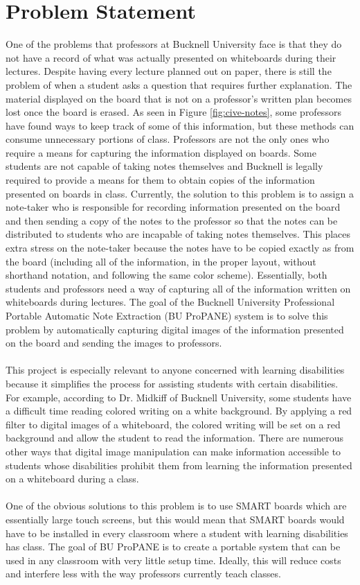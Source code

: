 \documentclass{article}
\begin{document}
	\section{Problem Statement}
		One of the problems that professors at Bucknell University face is that they do not have a record of what was actually presented on whiteboards during their lectures. Despite having every lecture planned out on paper, there is still the problem of when a student asks a question that requires further explanation. The material displayed on the board that is not on a professor's written plan becomes lost once the board is erased. As seen in Figure \ref{fig:cive-notes}, some professors have found ways to keep track of some of this information, but these methods can consume unnecessary portions of class. Professors are not the only ones who require a means for capturing the information displayed on boards. Some students are not capable of taking notes themselves and Bucknell is legally required to provide a means for them to obtain copies of the information presented on boards in class. Currently, the solution to this problem is to assign a note-taker who is responsible for recording information presented on the board and then sending a copy of the notes to the professor so that the notes can be distributed to students who are incapable of taking notes themselves. This places extra stress on the note-taker because the notes have to be copied exactly as from the board (including all of the information, in the proper layout, without shorthand notation, and following the same color scheme). Essentially, both students and professors need a way of capturing all of the information written on whiteboards during lectures. The goal of the Bucknell University Professional Portable Automatic Note Extraction (BU ProPANE) system is to solve this problem by automatically capturing digital images of the information presented on the board and sending the images to professors.\\
		\\
		This project is especially relevant to anyone concerned with learning disabilities because it simplifies the process for assisting students with certain disabilities. For example, according to Dr. Midkiff of Bucknell University, some students have a difficult time reading colored writing on a white background. By applying a red filter to digital images of a whiteboard, the colored writing will be set on a red background and allow the student to read the information. There are numerous other ways that digital image manipulation can make information accessible to students whose disabilities prohibit them from learning the information presented on a whiteboard during a class.\\
		\\
		One of the obvious solutions to this problem is to use SMART boards which are essentially large touch screens, but this would mean that SMART boards would have to be installed in every classroom where a student with learning disabilities has class. The goal of BU ProPANE is to create a portable system that can be used in any classroom with very little setup time. Ideally, this will reduce costs and interfere less with the way professors currently teach classes. 
		
\end{document}
